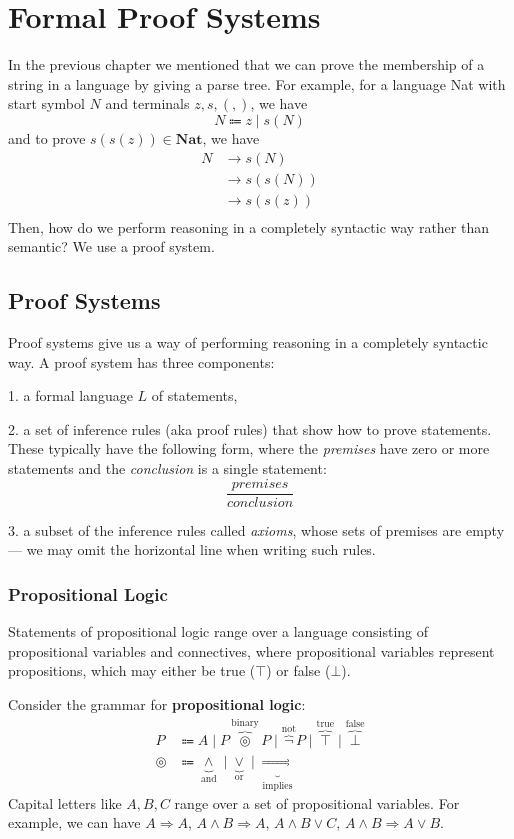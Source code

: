 \chapter{Formal Proof Systems}

In the previous chapter we mentioned that we can prove the membership of a string in a language by giving a parse tree. For example, for a language Nat with start symbol \(N\) and terminals \(z, s, (,)\), we have
\[
  N \Coloneqq z \mid s(N)
\]
and to prove \(s(s(z)) \in \textbf{Nat}\), we have
\[
  \begin{aligned}
    N &\to s(N) \\
    &\to s(s(N)) \\
    &\to s(s(z)) \\
  \end{aligned}
\]
Then, how do we perform reasoning in a completely syntactic way rather than semantic? We use a proof system. 

\section{Proof Systems}
Proof systems give us a way of performing reasoning in a completely syntactic way. A proof system has three components:

1. a formal language \(L\) of statements,

2. a set of inference rules (aka proof rules) that show how to prove statements. These typically have the following form, where the \textit{premises} have zero or more statements and the \textit{conclusion} is a single statement:
\[
  \dfrac{\textit{premises}}{\textit{conclusion}}
\]

3. a subset of the inference rules called \textit{axioms}, whose sets of premises are empty — we may omit the horizontal line when writing such rules.

\subsection{Propositional Logic}
Statements of propositional logic range over a language consisting of propositional variables and connectives, where propositional variables represent propositions, which may either be true (\(\top\)) or false (\(\bot\)). 

Consider the grammar for \textbf{propositional logic}:
\[
  \begin{aligned}
    P &\Coloneqq A \mid P \overbrace{\circledcirc}^{\text{binary}} P \mid \overbrace{\neg}^{\text{not}} P \mid \overbrace{\top}^{\text{true}} \mid \overbrace{\bot}^{\text{false}} \\
    \circledcirc &\Coloneqq \underbrace{\wedge}_{\text{and}} \mid \underbrace{\vee}_{\text{or}} \mid \underbrace{\Rightarrow}_{\text{implies}}
  \end{aligned}
\]
Capital letters like \(A, B, C\) range over a set of propositional variables. For example, we can have \(A \Rightarrow A\), \(A \wedge B \Rightarrow A\), \(A \wedge B \vee C\), \(A \wedge B \Rightarrow A \vee B\). 

